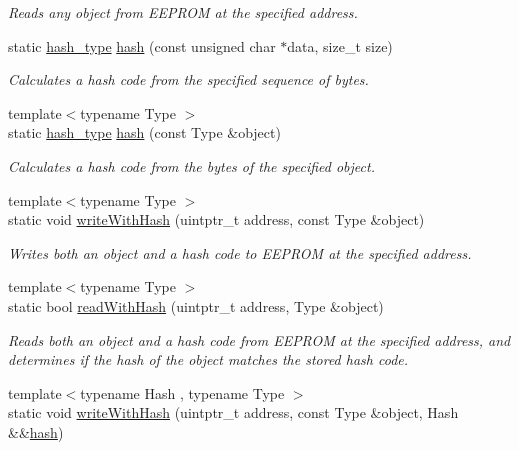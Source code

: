 \begin{DoxyCompactItemize}
\begin{DoxyCompactList}\small\item\em Reads any object from E\+E\+P\+R\+OM at the specified address. \end{DoxyCompactList}\item 
static \mbox{\hyperlink{classArduboy2EEPROM_a6221853153af216c0d6087f1e1455cd7}{hash\+\_\+type}} \mbox{\hyperlink{classArduboy2EEPROM_a0d81ac363020a75a0b56af7eb014f5b4}{hash}} (const unsigned char $\ast$data, size\+\_\+t size)
\begin{DoxyCompactList}\small\item\em Calculates a hash code from the specified sequence of bytes. \end{DoxyCompactList}\item 
{\footnotesize template$<$typename Type $>$ }\\static \mbox{\hyperlink{classArduboy2EEPROM_a6221853153af216c0d6087f1e1455cd7}{hash\+\_\+type}} \mbox{\hyperlink{classArduboy2EEPROM_a1eb431b4eb962bbd5fe1b18d7ac2af21}{hash}} (const Type \&object)
\begin{DoxyCompactList}\small\item\em Calculates a hash code from the bytes of the specified object. \end{DoxyCompactList}\item 
{\footnotesize template$<$typename Type $>$ }\\static void \mbox{\hyperlink{classArduboy2EEPROM_a55111051528b8d43a03bd7dd842b0679}{write\+With\+Hash}} (uintptr\+\_\+t address, const Type \&object)
\begin{DoxyCompactList}\small\item\em Writes both an object and a hash code to E\+E\+P\+R\+OM at the specified address. \end{DoxyCompactList}\item 
{\footnotesize template$<$typename Type $>$ }\\static bool \mbox{\hyperlink{classArduboy2EEPROM_abbfe69135a48dc52120d209bfba38b7a}{read\+With\+Hash}} (uintptr\+\_\+t address, Type \&object)
\begin{DoxyCompactList}\small\item\em Reads both an object and a hash code from E\+E\+P\+R\+OM at the specified address, and determines if the hash of the object matches the stored hash code. \end{DoxyCompactList}\item 
{\footnotesize template$<$typename Hash , typename Type $>$ }\\static void \mbox{\hyperlink{classArduboy2EEPROM_a40f0abec863d2772e8da19d3cf37e980}{write\+With\+Hash}} (uintptr\+\_\+t address, const Type \&object, Hash \&\&\mbox{\hyperlink{classArduboy2EEPROM_a0d81ac363020a75a0b56af7eb014f5b4}{hash}})

\end{DoxyCompactItemize}
